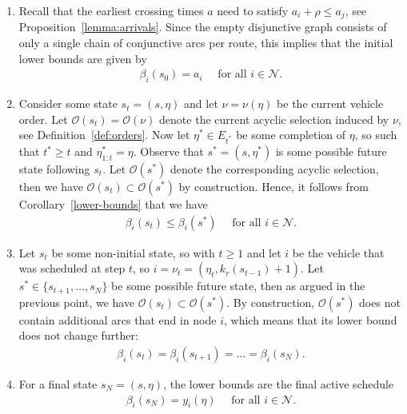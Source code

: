 \documentclass[a4paper]{report}
\theoremstyle{definition}
\theoremstyle{plain}
\begin{document}
\begin{enumerate}[label=(\roman*)\;\;,leftmargin=3.5em,midpenalty=5]
  \item Recall that the earliest crossing times $a$ need to satisfy $a_i + \rho \leq a_j$,
        see Proposition~\ref{lemma:arrivals}. Since the empty disjunctive graph consists of only
        a single chain of conjunctive arcs per route, this implies that the
        initial lower bounds are given by
        \begin{align}
          \beta_i(s_0) = a_i \quad \text{ for all } i \in \mathcal{N}.
        \end{align}

  \item Consider some state $s_t = (s, \eta)$ and let $\nu = \nu(\eta)$ be the
        current vehicle order. Let $\mathcal{O}(s_t) = \mathcal{O}(\nu)$ denote
        the current acyclic selection induced by $\nu$, see
        Definition~\ref{def:orders}.
        Now let $\eta^* \in E_{t^*}$ be some completion of $\eta$, so such that
        $t^* \geq t$ and $\eta^*_{1:t} = \eta$.
        Observe that $s^* = (s, \eta^*)$ is some possible future state following
        $s_t$. Let $\mathcal{O}(s^*)$ denote the corresponding acyclic
        selection, then we have $\mathcal{O}(s_t) \subset \mathcal{O}(s^*)$ by
        construction. Hence, it follows from Corollary~\ref{lower-bounds} that
        we have
        \begin{align}
          \beta_i(s_t) \leq \beta_i(s^*) \quad \text{ for all } i \in \mathcal{N} .
        \end{align}

  \item Let $s_t$ be some non-initial state, so with $t \geq 1$ and let $i$ be
        the vehicle that was scheduled at step $t$, so
        $i = \nu_t =  (\eta_t, k_r(s_{t-1}) + 1)$.
        Let $s^* \in \{s_{t+1}, \dots, s_N\}$ be some possible future state,
        then as argued in the previous point, we have
        $\mathcal{O}(s_t) \subset \mathcal{O}(s^*)$.
        By construction, $\mathcal{O}(s^*)$ does not contain additional arcs
        that end in node $i$, which means that its lower bound does not change
        further:
        \begin{align}
          \beta_i(s_t) = \beta_{i}(s_{t+1}) = \dots = \beta_i(s_N) .
        \end{align}

  \item For a final state $s_N = (s, \eta)$, the lower bounds are the final
        active schedule
        \begin{align*}
          \beta_i(s_N) = y_i(\eta) \quad \text{ for all } i \in \mathcal{N}.
        \end{align*}

\end{enumerate}
\end{document}
